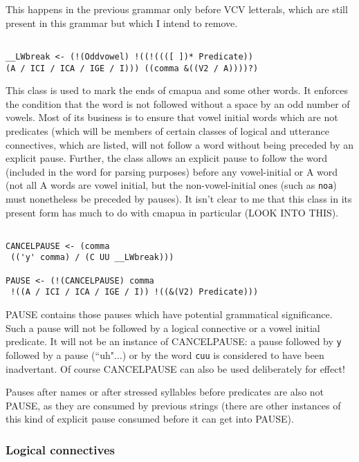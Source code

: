 \documentclass[12pt]{article}
\begin{document}
This happens in the previous grammar only before VCV letterals, which are still present in this grammar but which I intend to remove.

\begin{verbatim}

__LWbreak <- (!(Oddvowel) !((!((([ ])* Predicate)) 
(A / ICI / ICA / IGE / I))) ((comma &((V2 / A))))?)

\end{verbatim}

This class is used to mark the ends of cmapua and some other words.  It enforces the condition that the word
is not followed without a space by an odd number of vowels.  Most of its business is to ensure that vowel initial words which are not predicates (which will be members of certain classes of logical and utterance connectives, which are listed, will not follow a word without being preceded by an explicit pause.  Further, the class allows an explicit pause to follow the word
(included in the word for parsing purposes) before any vowel-initial or A word (not all A words are vowel initial, but the non-vowel-initial ones (such as {\tt noa}) must nonetheless be preceded by pauses).  It isn't clear to me that this class in its present form has much to do with cmapua in particular (LOOK INTO THIS).

\begin{verbatim}

CANCELPAUSE <- (comma
 (('y' comma) / (C UU __LWbreak)))

PAUSE <- (!(CANCELPAUSE) comma
 !((A / ICI / ICA / IGE / I)) !((&(V2) Predicate)))

\end{verbatim}

PAUSE contains those pauses which have potential grammatical significance.  Such a pause will not be followed
by a logical connective or a vowel initial predicate.  It will not be an instance of CANCELPAUSE:  a pause followed
by {\tt y} followed by a pause (``uh"$\ldots$) or by the word {\tt cuu} is considered to have been inadvertant.  Of course CANCELPAUSE can also be used deliberately for effect!

Pauses after names or after stressed syllables before predicates are also not PAUSE, as they are consumed by previous
strings (there are other instances of this kind of explicit pause consumed before it can get into PAUSE).

\subsubsection{Logical connectives}
\end{document}
